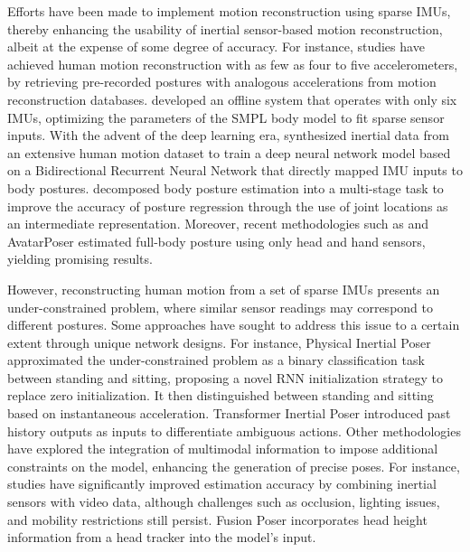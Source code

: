 \documentclass[letterpaper]{article} %
\begin{document}
Efforts have been made to implement motion reconstruction using sparse IMUs, thereby enhancing the usability of inertial sensor-based motion reconstruction, albeit at the expense of some degree of accuracy. For instance, studies \cite{slyper2008action,tautges2011motion} have achieved human motion reconstruction with as few as four to five accelerometers, by retrieving pre-recorded postures with analogous accelerations from motion reconstruction databases. \cite{von2017sparse} developed an offline system that operates with only six IMUs, optimizing the parameters of the SMPL body model \cite{loper2015smpl} to fit sparse sensor inputs. With the advent of the deep learning era, \cite{huang2018deep} synthesized inertial data from an extensive human motion dataset to train a deep neural network model based on a Bidirectional Recurrent Neural Network that directly mapped IMU inputs to body postures. \cite{yi2021transpose} decomposed body posture estimation into a multi-stage task to improve the accuracy of posture regression through the use of joint locations as an intermediate representation. Moreover, recent methodologies such as \cite{dittadi2021full} and AvatarPoser \cite{jiang2022avatarposer} estimated full-body posture using only head and hand sensors, yielding promising results.

However, reconstructing human motion from a set of sparse IMUs presents an under-constrained problem, where similar sensor readings may correspond to different postures. Some approaches have sought to address this issue to a certain extent through unique network designs. For instance, Physical Inertial Poser \cite{yi2022physical} approximated the under-constrained problem as a binary classification task between standing and sitting, proposing a novel RNN initialization strategy to replace zero initialization. It then distinguished between standing and sitting based on instantaneous acceleration. Transformer Inertial Poser \cite{jiang2022transformer} introduced past history outputs as inputs to differentiate ambiguous actions.
Other methodologies have explored the integration of multimodal information to impose additional constraints on the model, enhancing the generation of precise poses. For instance, studies \cite{von2018recovering,malleson2017real,von2016human} have significantly improved estimation accuracy by combining inertial sensors with video data, although challenges such as occlusion, lighting issues, and mobility restrictions still persist. Fusion Poser \cite{kim2022fusion} incorporates head height information from a head tracker into the model's input.
\end{document}
